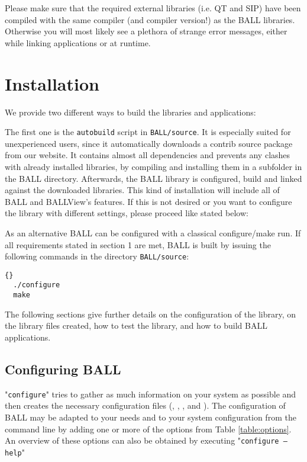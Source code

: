 Please make sure that the required external \CPP libraries (i.e. QT and SIP)
have been compiled with the same compiler (and compiler version!) as the BALL
libraries. Otherwise you will most likely see a plethora of strange error
messages, either while linking applications or at runtime.

\section{Installation}
\label{section:building-ball}

We provide two different ways to build the libraries and applications:

The first one is the {\tt autobuild} script in {\tt BALL/source}.
It is especially suited for unexperienced users, since it automatically 
downloads a contrib source package from our website. It contains almost 
all dependencies and prevents any clashes with already installed libraries,
by compiling and installing them in a subfolder in the BALL directory.
Afterwards, the BALL library is configured, build and linked against the
downloaded libraries. This kind of installation will include all of BALL 
and BALLView's features. If this is not desired or you want to configure 
the library with different settings, please proceed like stated below:

As an alternative BALL can be configured with a classical configure/make
run. If all requirements stated in section 1 are met, BALL is built by 
issuing the following commands in the directory {\tt BALL/source}:

\begin{lstlisting}{}
  ./configure
  make
\end{lstlisting}

The following sections give further details on the configuration of the library,
on the library files created, how to test the library, and how to build BALL 
applications.

\subsection{Configuring BALL}

"{\tt configure}" tries to gather as much information on your system as possible and 
then creates the necessary configuration files (,
, , and ).
The configuration of BALL may be adapted to your needs and to your system
configuration from the command line by adding one or more of the options from
Table \ref{table:options}.
An overview of these options can also be obtained by executing "{\tt configure
--help}"

